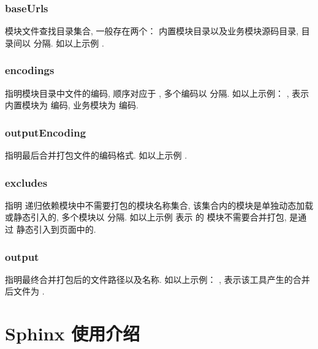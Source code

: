 \documentclass[letterpaper,10pt,english]{sphinxmanual}
\begin{document}
\subsubsection{baseUrls}
\label{tools/module-compiler/usage:baseurls}
模块文件查找目录集合, 一般存在两个：  内置模块目录以及业务模块源码目录, 目录间以 \code{,} 分隔.
如以上示例  .


\subsubsection{encodings}
\label{tools/module-compiler/usage:encodings}
指明模块目录中文件的编码, 顺序对应于  , 多个编码以 \code{,} 分隔. 如以上示例：  ,
表示  内置模块为  编码, 业务模块为  编码.


\subsubsection{outputEncoding}
\label{tools/module-compiler/usage:outputencoding}
指明最后合并打包文件的编码格式. 如以上示例  .


\subsubsection{excludes}
\label{tools/module-compiler/usage:excludes}
指明  递归依赖模块中不需要打包的模块名称集合, 该集合内的模块是单独动态加载或静态引入的, 多个模块以 \code{,} 分隔.
如以上示例  表示  的  模块不需要合并打包, 是通过  静态引入到页面中的.


\subsubsection{output}
\label{tools/module-compiler/usage:output}
指明最终合并打包后的文件路径以及名称. 如以上示例：  ,
表示该工具产生的合并后文件为  .


\section{Sphinx 使用介绍}
\label{tools/use-sphinx:sphinx}\label{tools/use-sphinx::doc}\label{tools/use-sphinx:usesphinx}
\end{document}
